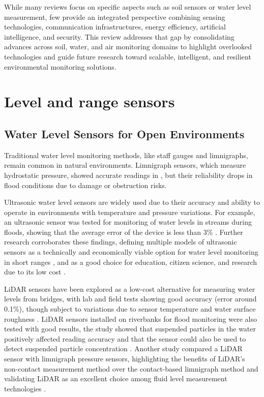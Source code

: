 \documentclass[conference]{IEEEtran}
\begin{document}

While many reviews focus on specific aspects such as soil sensors or water level measurement, few provide an integrated perspective combining sensing technologies, communication infrastructures, energy efficiency, artificial intelligence, and security. This review addresses that gap by consolidating advances across soil, water, and air monitoring domains to highlight overlooked technologies and guide future research toward scalable, intelligent, and resilient environmental monitoring solutions.

\section{Level and range sensors} \label{cap:sensors}

\subsection{Water Level Sensors for Open Environments} \label{subsec:water_level_sensors}

Traditional water level monitoring methods, like staff gauges and limnigraphs, remain common in natural environments. Limnigraph sensors, which measure hydrostatic pressure, showed accurate readings in \cite{santana_2024_development}, but their reliability drops in flood conditions due to damage or obstruction risks. 

Ultrasonic water level sensors are widely used due to their accuracy and ability to operate in environments with temperature and pressure variations. For example, an ultrasonic sensor was tested for monitoring of water levels in streams during floods, showing that the average error of the device is less than 3\% \cite{mohammadrezamasoudimoghaddam_2024_a}. Further research corroborates these findings, defining multiple models of ultrasonic sensors as a technically and economically viable option for water level monitoring in short ranges \cite{pereira_2022_evaluation}, and as a good choice for education, citizen science, and research due to its low cost \cite{bresnahan_2023_a}.

LiDAR sensors have been explored as a low-cost alternative for measuring water levels from bridges, with lab and field tests showing good accuracy (error around 0.1\%), though subject to variations due to sensor temperature and water surface roughness \cite{paul_2020_a}. LiDAR sensors installed on riverbanks for flood monitoring were also tested with good results, the study showed that suspended particles in the water positively affected reading accuracy and that the sensor could also be used to detect suspended particle concentration \cite{tamari_2016_flash}. Another study compared a LiDAR sensor with limnigraph pressure sensors, highlighting the benefits of LiDAR’s non-contact measurement method over the contact-based limnigraph method and validating LiDAR as an excellent choice among fluid level measurement technologies \cite{santana_2024_development}.
\end{document}

